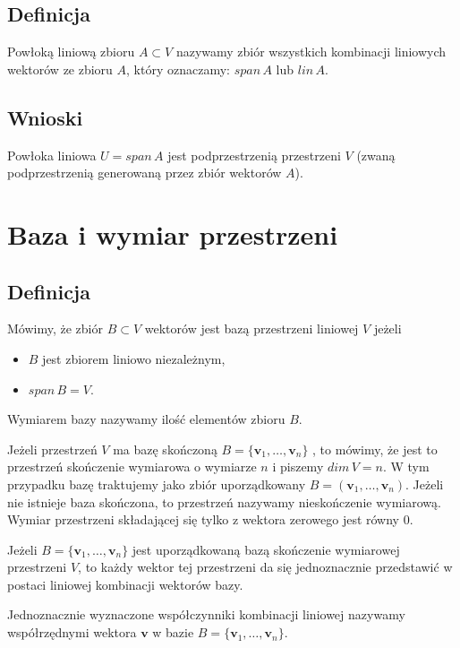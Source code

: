 \documentclass{article}
\begin{document}
\subsection{Definicja}
Powłoką liniową zbioru $A \subset V$ nazywamy zbiór wszystkich kombinacji liniowych wektorów ze zbioru $A$, który oznaczamy: $span\,A$ lub $lin\,A$.
\subsection{Wnioski}
Powłoka liniowa $U=span\,A$ jest podprzestrzenią przestrzeni $V$ (zwaną podprzestrzenią generowaną przez zbiór wektorów $A$).

\section{Baza i wymiar przestrzeni}
\subsection{Definicja}
Mówimy, że zbiór $B \subset V$ wektorów jest bazą przestrzeni liniowej $V$ jeżeli
\begin{itemize}
    \item $B$ jest zbiorem liniowo niezależnym,
    \item $span\,B=V$.
\end{itemize}
Wymiarem bazy nazywamy ilość elementów zbioru $B$.


Jeżeli przestrzeń $V$ ma bazę skończoną $B = \{ \mathbf{v}_1, \dots, \mathbf{v}_n \}$ , to mówimy, że jest to przestrzeń skończenie wymiarowa o wymiarze $n$ i piszemy $dim\,V=n$.
W tym przypadku bazę traktujemy jako zbiór uporządkowany $B = ( \mathbf{v}_1, \dots, \mathbf{v}_n )$.
Jeżeli nie istnieje baza skończona, to przestrzeń nazywamy nieskończenie wymiarową.
Wymiar przestrzeni składającej się tylko z wektora zerowego jest równy $0$.


Jeżeli $B = \{ \mathbf{v}_1, \dots, \mathbf{v}_n \}$ jest uporządkowaną bazą skończenie wymiarowej przestrzeni $V$, to każdy wektor tej przestrzeni da się jednoznacznie przedstawić w postaci liniowej kombinacji wektorów bazy.


Jednoznacznie wyznaczone współczynniki kombinacji liniowej nazywamy współrzędnymi wektora $\mathbf{v}$ w bazie $B = \{ \mathbf{v}_1, \dots, \mathbf{v}_n \}$.
\end{document}
